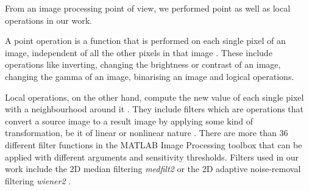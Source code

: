 
From an image processing point of view, we performed point as well as local operations in our work.

A point operation is a function that is performed on each single pixel of an image, independent of all the other pixels in that image \cite{maini2010comprehensive}. These include operations like inverting, changing the brightness or contrast of an image, changing the gamma of an image, binarising an image and logical operations. 

Local operations, on the other hand, compute the new value of each single pixel with a neighbourhood around it \cite{pointOperation2018}. %
They include filters which are operations that convert a source image to a result image by applying some kind of transformation, be it of linear or nonlinear nature \cite{pointOperation2018}. There are more than 36 different filter functions in the MATLAB Image Processing toolbox \cite{matlab} that can be applied with different arguments and sensitivity thresholds. Filters used in our work include the 2D median filtering \textit{medfilt2} or the 2D adaptive noise-removal filtering \textit{wiener2} \cite{matlab}.




